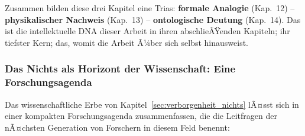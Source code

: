 ﻿\documentclass[12pt,a4paper]{report}
\begin{document}
Zusammen bilden diese drei Kapitel eine Trias: \textbf{formale Analogie} (Kap.~12) -- \textbf{physikalischer Nachweis} (Kap.~13) -- \textbf{ontologische Deutung} (Kap.~14). Das ist die intellektuelle DNA dieser Arbeit in ihren abschlieÃŸenden Kapiteln; ihr tiefster Kern; das, womit die Arbeit Ã¼ber sich selbst hinausweist.

\subsubsection{Das Nichts als Horizont der Wissenschaft: Eine Forschungsagenda}

Das wissenschaftliche Erbe von Kapitel~\ref{sec:verborgenheit_nichts} lÃ¤sst sich in einer kompakten Forschungsagenda zusammenfassen, die die Leitfragen der nÃ¤chsten Generation von Forschern in diesem Feld benennt:
\end{document}
